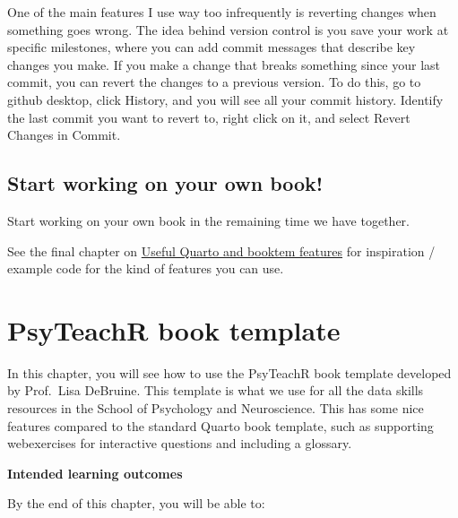 \documentclass[
  letterpaper,
  DIV=11,
  numbers=noendperiod]{scrreprt}
\begin{document}
\begin{tcolorbox}[enhanced jigsaw, colbacktitle=quarto-callout-tip-color!10!white, titlerule=0mm, leftrule=.75mm, title=\textcolor{quarto-callout-tip-color}{\faLightbulb}\hspace{0.5em}{Reverting changes}, breakable, bottomrule=.15mm, opacitybacktitle=0.6, rightrule=.15mm, opacityback=0, arc=.35mm, colframe=quarto-callout-tip-color-frame, toptitle=1mm, bottomtitle=1mm, toprule=.15mm, left=2mm, colback=white, coltitle=black]

One of the main features I use way too infrequently is reverting changes
when something goes wrong. The idea behind version control is you save
your work at specific milestones, where you can add commit messages that
describe key changes you make. If you make a change that breaks
something since your last commit, you can revert the changes to a
previous version. To do this, go to github desktop, click History, and
you will see all your commit history. Identify the last commit you want
to revert to, right click on it, and select Revert Changes in Commit.

\end{tcolorbox}

\section{Start working on your own
book!}\label{start-working-on-your-own-book}

Start working on your own book in the remaining time we have together.

See the final chapter on \hyperref[quarto_features]{Useful Quarto and
booktem features} for inspiration / example code for the kind of
features you can use.

\chapter{PsyTeachR book template}\label{psyteachr_book}

In this chapter, you will see how to use the PsyTeachR book template
developed by Prof.~Lisa DeBruine. This template is what we use for all
the data skills resources in the School of Psychology and Neuroscience.
This has some nice features compared to the standard Quarto book
template, such as supporting webexercises for interactive questions and
including a glossary.

\textbf{Intended learning outcomes}

By the end of this chapter, you will be able to:
\end{document}
